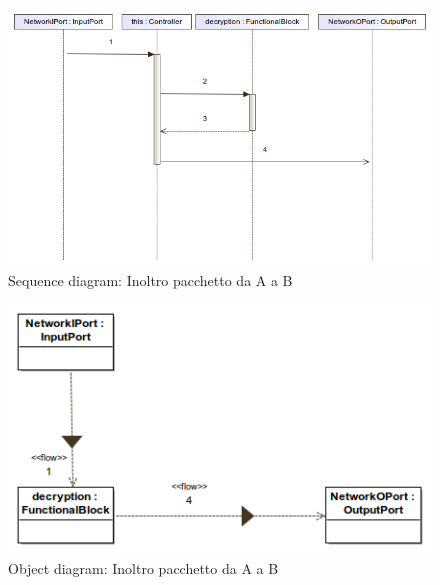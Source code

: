 \begin{figure}[h!] 
    \centering 
        \includegraphics[width=\textwidth]{img/FirstMessage.png} 
        \caption{Sequence diagram: Inoltro pacchetto da A a B} 
        \label{fig:sd}
\end{figure}
\newpage
\begin{figure}[h!]
    \includegraphics[scale=0.8]{img/FirstMessage_2.png} 
    \caption{Object diagram: Inoltro pacchetto da A a B} 
    \label{fig:od}
\end{figure}

